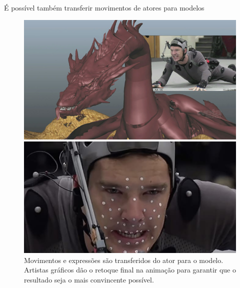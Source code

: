 \documentclass[brazil]{beamer}
\begin{document}
\begin{frame}
  É possível também transferir movimentos de atores para modelos
  \begin{figure}[ht]
        \begin{minipage}[b]{0.45\linewidth}
            \centering
            \includegraphics[width = 1.0\textwidth, keepaspectratio]{./img/smaug_left.jpg}
        \end{minipage}
        \begin{minipage}[b]{0.45\linewidth}
          \centering
              \includegraphics[width = 1.0\textwidth, keepaspectratio]{./img/smaug_right.jpg}
        \end{minipage}

        \caption{Movimentos e expressões são transferidos do ator para o modelo.
       Artistas gráficos dão o retoque final na animação para garantir que o
     resultado seja o mais convincente possível. }
      \end{figure}
\end{frame}
\end{document}
